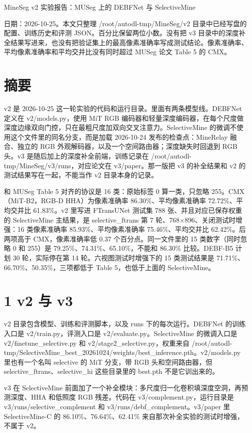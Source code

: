 \documentclass[11pt]{article}
\begin{document}
{\centering\Large MineSeg v2 实验报告：MUSeg 上的 DEBFNet 与 SelectiveMine\par}
\vspace{0.8em}
日期：2026-10-25。本文只整理 /root/autodl-tmp/MineSeg/v2 目录中已经写盘的配置、训练历史和评测 JSON。百分比保留两位小数。没有把 v3 目录中的深度补全结果写进来，也没有把验证集上的最高像素准确率写成测试结论。像素准确率、平均像素准确率和平均交并比没有同时超过 MUSeg 论文 Table 5 的 CMX。

\section*{摘要}
v2 是 2026-10-25 这一轮实验的代码和运行目录。里面有两条模型线。DEBFNet 定义在 v2/models.py，使用 MiT RGB 编码器和轻量深度编码器，在每个尺度做深度边缘双向门控，只在最粗尺度加双向交叉注意力。SelectiveMine 的微调不使用这个文件里的同名分支，而是加载 2026-10-24 发布的检查点：MineRelay 融合、独立的 RGB 外观解码器，以及一个空间路由器；深度缺失时回退到 RGB 头。v3 是随后加上的深度补全前端，训练记录在 /root/autodl-tmp/MineSeg/v3/runs，对应论文在 v3/paper。那一版把 v3 的补全结果和 v2 的测试结果写在一起，不能当作 v2 目录本身的记录。

和 MUSeg Table 5 对齐的协议是 16 类：原始标签 0 算一类，只忽略 255。CMX（MiT-B2，RGB-D HHA）为像素准确率 86.30\%、平均像素准确率 72.72\%、平均交并比 61.83\%。v2 里写进 FTransUNet 测试集 788 张、并且对应已保存权重的 SelectiveMine 主结果，是 selective\_ftrans 第 7 轮、768×896、关闭测试时增强：16 类像素准确率 85.93\%、平均像素准确率 75.46\%、平均交并比 62.42\%。后两项高于 CMX，像素准确率低 0.37 个百分点。同一文件里的 15 类数字（同时忽略 0 和 255）是 79.25\%、74.31\%、65.10\%，不能和 86.30\% 比较。DEBF-B5 计划 30 轮，实际停在第 14 轮。六视图测试时增强下的 15 类测试结果是 71.71\%、66.70\%、50.35\%，三项都低于 Table 5，也低于上面的 SelectiveMine。

\section*{1  v2 与 v3}
v2 目录包含模型、训练和评测脚本，以及 runs 下的每次运行。DEBFNet 的训练入口是 v2/train.py，评测入口是 v2/evaluate.py。SelectiveMine 的微调入口是 v2/finetune\_selective.py 和 v2/stage2\_selective.py，权重来自 /root/autodl-tmp/SelectiveMine\_best\_20261024/weights/best\_inference.pth。v2/models.py 里也有一个名叫 selective 的 MiT 分支，带 RGB 头和空间路由器，但 selective\_ftrans、selective\_hi 这些目录里的 best.pth 不是它训出来的。

v3 在 SelectiveMine 前面加了一个补全模块：多尺度归一化卷积填深度空洞，再预测深度、HHA 和低照度 RGB 残差。代码在 v3/complement.py，运行目录是 v3/runs/selective\_complement 和 v3/runs/debf\_complement。v3/paper 里 SelectiveMine-C 的 86.10\%、76.64\%、62.41\% 来自那次补全实验的测试时增强，不属于 v2。
\end{document}
